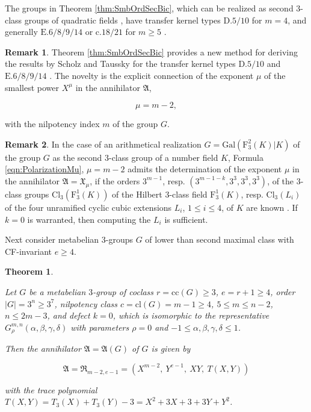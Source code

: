 \documentclass{amsart}
\newtheorem{theorem}{Theorem}[section]
\theoremstyle{definition}
\newtheorem{remark}{Remark}[section]
\numberwithin{equation}{section}
\begin{document}
\noindent
The groups in Theorem
\ref{thm:SmbOrdSecBic},
which can be realized as second \(3\)-class groups of quadratic fields
\cite{Ma4},
have transfer kernel types \(\mathrm{D.5/10}\) for \(m=4\),
and generally \(\mathrm{E.6/8/9/14}\) or \(\mathrm{c.18/21}\) for \(m\ge 5\)
\cite{Ma2}.


\begin{remark}
\label{rmk:SmbOrdSecBic}
Theorem
\ref{thm:SmbOrdSecBic}
provides a new method for deriving the results by Scholz and Taussky
\cite{SoTa}
for the transfer kernel types \(\mathrm{D.5/10}\) and \(\mathrm{E.6/8/9/14}\)
\cite{Ma2}.
The novelty is the explicit connection of the exponent \(\mu\)
of the smallest power \(X^\mu\) in the annihilator \(\mathfrak{A}\),

\begin{equation}
\label{eqn:PolarizationMu}
\mu=m-2,
\end{equation}

\noindent
with the nilpotency index \(m\) of the group \(G\).
\end{remark}


\begin{remark}
\label{rmk:ClassFieldTheoryMu}
In the case of an arithmetical realization
\(G=\mathrm{Gal}(\mathrm{F}_3^2(K)\vert K)\)
of the group \(G\)
as the second \(3\)-class group of a number field \(K\), Formula
\eqref{eqn:PolarizationMu},
\(\mu=m-2\) admits
the determination of the exponent \(\mu\) in the annihilator \(\mathfrak{A}=\mathfrak{X}_{\mu}\),
if the orders \(3^{m-1}\), resp.  \((3^{m-1-k},3^{3},3^3,3^3)\), of the \(3\)-class groups
\(\mathrm{Cl}_3(\mathrm{F}_3^1(K))\) of the Hilbert \(3\)-class field \(\mathrm{F}_3^1(K)\),
resp. \(\mathrm{Cl}_3(L_i)\) of the four unramified cyclic cubic extensions \(L_i\), \(1\le i\le 4\),
of \(K\) are known
\cite[Thm. 3.12]{Ma4}.
If \(k=0\) is warranted, then computing the \(L_i\) is sufficient.
\end{remark}


\noindent
Next consider metabelian \(3\)-groups \(G\)
of lower than second maximal class with CF-invariant \(e\ge 4\).

\begin{theorem}
\label{thm:SmbOrdLowBic}

Let \(G\) be a metabelian \(3\)-group of coclass \(r=\mathrm{cc}(G)\ge 3\), \(e=r+1\ge 4\),
order \(\lvert G\rvert=3^n\ge 3^7\), nilpotency class \(c=\mathrm{cl}(G)=m-1\ge 4\), \(5\le m\le n-2\), \(n\le 2m-3\),
and defect \(k=0\),
which is isomorphic to the representative \(G_\rho^{m,n}(\alpha,\beta,\gamma,\delta)\)
with parameters \(\rho=0\) and \(-1\le\alpha,\beta,\gamma,\delta\le 1\).

Then the annihilator \(\mathfrak{A}=\mathfrak{A}(G)\) of \(G\) is given by

\begin{equation}
\label{eqn:SmbOrdLowBic}
\mathfrak{A}=\mathfrak{R}_{m-2,e-1}=\left(X^{m-2},\ Y^{e-1},\ XY,\ T(X,Y)\right)
\end{equation}

\noindent
with the trace polynomial \(T(X,Y)=T_3(X)+T_3(Y)-3=X^2+3X+3+3Y+Y^2\).

\end{theorem}
\end{document}
